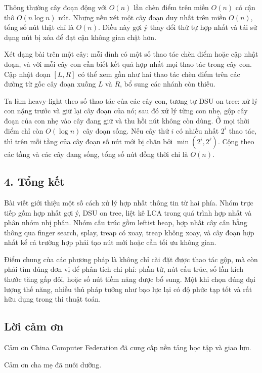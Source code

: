 \documentclass[11pt]{article}
\begin{document}
Thông thường cây đoạn động với \(O(n)\) lần chèn điểm trên miền \(O(n)\) có
cận thô \(O(n\log n)\) nút. Nhưng nếu xét một cây đoạn duy nhất trên miền
\(O(n)\), tổng số nút thật chỉ là \(O(n)\). Điều này gợi ý thay đổi thứ tự hợp
nhất và tái sử dụng nút bị xóa để đạt cận không gian chặt hơn.

Xét dạng bài trên một cây: mỗi đỉnh có một số thao tác chèn điểm hoặc cập nhật
đoạn, và với mỗi cây con cần biết kết quả hợp nhất mọi thao tác trong cây con.
Cập nhật đoạn \([L,R]\) có thể xem gần như hai thao tác chèn điểm trên các
đường từ gốc cây đoạn xuống \(L\) và \(R\), bổ sung các nhánh còn thiếu.

Ta làm heavy-light theo số thao tác của các cây con, tương tự DSU on tree: xử
lý con nặng trước và giữ lại cây đoạn của nó; sau đó xử lý từng con nhẹ, gộp
cây đoạn của con nhẹ vào cây đang giữ và thu hồi nút không còn dùng. Ở mọi thời
điểm chỉ còn \(O(\log n)\) cây đoạn sống. Nếu cây thứ \(i\) có nhiều nhất
\(2^i\) thao tác, thì trên mỗi tầng của cây đoạn số nút mới bị chặn bởi
\(\min(2^i,2^\ell)\). Cộng theo các tầng và các cây đang sống, tổng số nút
đồng thời chỉ là \(O(n)\).

\subsection*{4. Tổng kết}

Bài viết giới thiệu một số cách xử lý hợp nhất thông tin từ hai phía. Nhóm trực
tiếp gồm hợp nhất gợi ý, DSU on tree, liệt kê LCA trong quá trình hợp nhất và
phân nhóm nhị phân. Nhóm cấu trúc gồm leftist heap, hợp nhất cây cân bằng thông
qua finger search, splay, treap có xoay, treap không xoay, và cây đoạn hợp nhất
kể cả trường hợp phải tạo nút mới hoặc cần tối ưu không gian.

Điểm chung của các phương pháp là không chỉ cài đặt được thao tác gộp, mà còn
phải tìm đúng đơn vị để phân tích chi phí: phần tử, nút cấu trúc, số lần kích
thước tăng gấp đôi, hoặc số nút tiềm năng được bổ sung. Một khi chọn đúng đại
lượng thế năng, nhiều thủ pháp tưởng như bạo lực lại có độ phức tạp tốt và rất
hữu dụng trong thi thuật toán.

\subsection*{Lời cảm ơn}

Cảm ơn China Computer Federation đã cung cấp nền tảng học tập và giao lưu.

Cảm ơn cha mẹ đã nuôi dưỡng.
\end{document}
